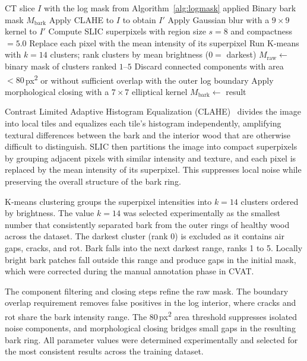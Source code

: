 \begin{algorithm}[H]
\caption{Bark initial segmentation per CT slice}
\label{alg:bark}
\begin{algorithmic}[1]
\Require CT slice $I$ with the log mask from Algorithm~\ref{alg:logmask} applied
\Ensure Binary bark mask $M_\text{bark}$
\State Apply CLAHE to $I$ to obtain $I'$
\State Apply Gaussian blur with a $9 \times 9$ kernel to $I'$
\State Compute SLIC superpixels with region size $s = 8$ and compactness $= 5.0$
\State Replace each pixel with the mean intensity of its superpixel
\State Run K-means with $k = 14$ clusters; rank clusters by mean brightness ($0 =$ darkest)
\State $M_\text{raw} \gets$ binary mask of clusters ranked $1$--$5$
\State Discard connected components with area $< 80$\,px\textsuperscript{2} or without sufficient overlap with the outer log boundary
\State Apply morphological closing with a $7 \times 7$ elliptical kernel
\State $M_\text{bark} \gets$ result
\end{algorithmic}
\end{algorithm}

Contrast Limited Adaptive Histogram Equalization (CLAHE)~\cite{zuiderveld1994clahe} divides the image into local tiles and equalizes each tile's histogram independently, amplifying textural differences between the bark and the interior wood that are otherwise difficult to distinguish. SLIC then partitions the image into compact superpixels by grouping adjacent pixels with similar intensity and texture, and each pixel is replaced by the mean intensity of its superpixel. This suppresses local noise while preserving the overall structure of the bark ring.

K-means clustering groups the superpixel intensities into $k = 14$ clusters ordered by brightness. The value $k = 14$ was selected experimentally as the smallest number that consistently separated bark from the outer rings of healthy wood across the dataset. The darkest cluster (rank 0) is excluded as it contains air gaps, cracks, and rot. Bark falls into the next darkest range, ranks 1 to 5. Locally bright bark patches fall outside this range and produce gaps in the initial mask, which were corrected during the manual annotation phase in CVAT.

The component filtering and closing steps refine the raw mask. The boundary overlap requirement removes false positives in the log interior, where cracks and rot share the bark intensity range. The $80$\,px\textsuperscript{2} area threshold suppresses isolated noise components, and morphological closing bridges small gaps in the resulting bark ring. All parameter values were determined experimentally and selected for the most consistent results across the training dataset.

